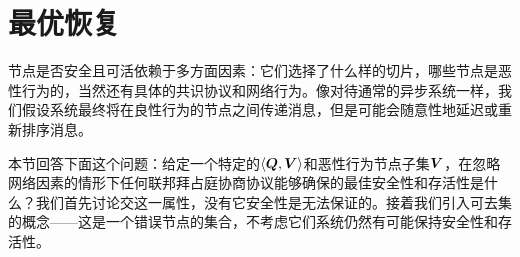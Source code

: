 \section{最优恢复}\label{sec:resilience}

节点是否安全且可活依赖于多方面因素：它们选择了什么样的{\quorum}切片，哪些节点是恶性行为的，当然还有具体的共识协议和网络行为。像对待通常的异步系统一样，我们假设系统最终将在良性行为的节点之间传递消息，但是可能会随意性地延迟或重新排序消息。

本节回答下面这个问题：给定一个特定的$\langle{\bm Q},{\bm V}\rangle$和恶性行为节点子集${\bm V}$，在忽略网络因素的情形下任何联邦拜占庭协商协议能够确保的最佳安全性和存活性是什么？我们首先讨论{\quorum}交这一属性，没有它安全性是无法保证的。接着我们引入可去集的概念——这是一个错误节点的集合，不考虑它们系统仍然有可能保持安全性和存活性。




